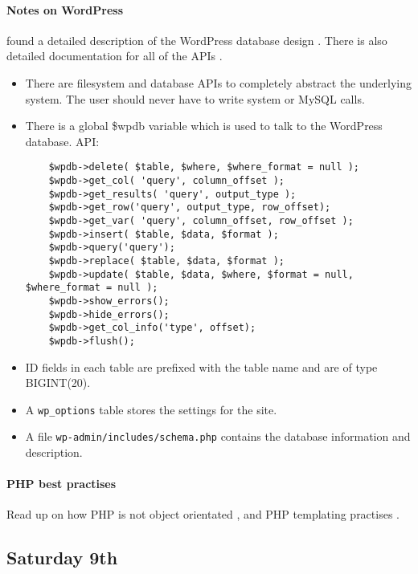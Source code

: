 \paragraph{Notes on WordPress} found a detailed description of the
WordPress database design \cite{WordPressND}. There is also detailed
documentation for all of the APIs \cite{WordPressNDa}.
\begin{itemize}
\item There are filesystem and database APIs to completely abstract the
  underlying system. The user should never have to write system or MySQL calls.
\item There is a global \$wpdb variable which is used to talk to the WordPress
  database. API:
\begin{verbatim}
    $wpdb->delete( $table, $where, $where_format = null );
    $wpdb->get_col( 'query', column_offset );
    $wpdb->get_results( 'query', output_type );
    $wpdb->get_row('query', output_type, row_offset);
    $wpdb->get_var( 'query', column_offset, row_offset );
    $wpdb->insert( $table, $data, $format );
    $wpdb->query('query');
    $wpdb->replace( $table, $data, $format );
    $wpdb->update( $table, $data, $where, $format = null, $where_format = null );
    $wpdb->show_errors();
    $wpdb->hide_errors();
    $wpdb->get_col_info('type', offset);
    $wpdb->flush();
\end{verbatim}
\item ID fields in each table are prefixed with the table name and are of type
  BIGINT(20).
\item A \texttt{wp\_options} table stores the settings for the site.
\item A file \texttt{wp-admin/includes/schema.php} contains the database
  information and description.
\end{itemize}

\paragraph{PHP best practises} Read up on how PHP is not object orientated
\cite{Kimsal2011}, and PHP templating practises \cite{Rakowski2011}.

\subsection{Saturday 9th}
